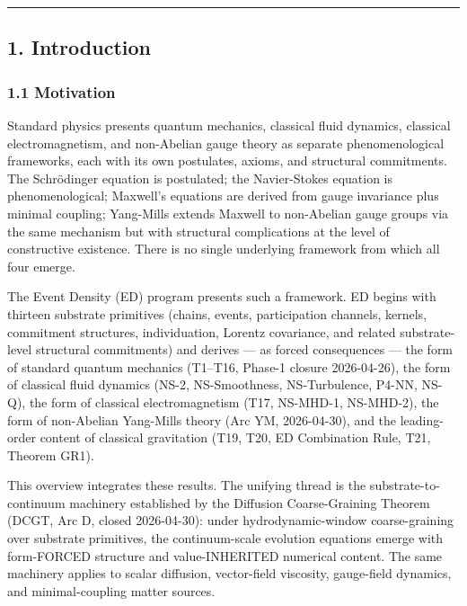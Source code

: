 \documentclass[
  11pt,a4paper]{article}
\begin{document}
\begin{center}\rule{0.5\linewidth}{0.5pt}\end{center}

\subsection{1. Introduction}\label{introduction}

\subsubsection{1.1 Motivation}\label{motivation}

Standard physics presents quantum mechanics, classical fluid dynamics,
classical electromagnetism, and non-Abelian gauge theory as separate
phenomenological frameworks, each with its own postulates, axioms, and
structural commitments. The Schrödinger equation is postulated; the
Navier-Stokes equation is phenomenological; Maxwell's equations are
derived from gauge invariance plus minimal coupling; Yang-Mills extends
Maxwell to non-Abelian gauge groups via the same mechanism but with
structural complications at the level of constructive existence. There
is no single underlying framework from which all four emerge.

The Event Density (ED) program presents such a framework. ED begins with
thirteen substrate primitives (chains, events, participation channels,
kernels, commitment structures, individuation, Lorentz covariance, and
related substrate-level structural commitments) and derives --- as
forced consequences --- the form of standard quantum mechanics (T1--T16,
Phase-1 closure 2026-04-26), the form of classical fluid dynamics (NS-2,
NS-Smoothness, NS-Turbulence, P4-NN, NS-Q), the form of classical
electromagnetism (T17, NS-MHD-1, NS-MHD-2), the form of non-Abelian
Yang-Mills theory (Arc YM, 2026-04-30), and the leading-order content of
classical gravitation (T19, T20, ED Combination Rule, T21, Theorem GR1).

This overview integrates these results. The unifying thread is the
substrate-to-continuum machinery established by the Diffusion
Coarse-Graining Theorem (DCGT, Arc D, closed 2026-04-30): under
hydrodynamic-window coarse-graining over substrate primitives, the
continuum-scale evolution equations emerge with form-FORCED structure
and value-INHERITED numerical content. The same machinery applies to
scalar diffusion, vector-field viscosity, gauge-field dynamics, and
minimal-coupling matter sources.
\end{document}
